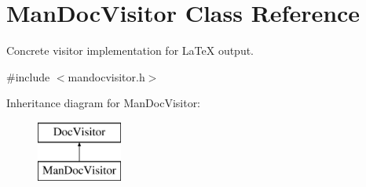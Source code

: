 \hypertarget{class_man_doc_visitor}{}\section{Man\+Doc\+Visitor Class Reference}
\label{class_man_doc_visitor}


Concrete visitor implementation for La\+TeX output.  




{\ttfamily \#include $<$mandocvisitor.\+h$>$}

Inheritance diagram for Man\+Doc\+Visitor\+:\begin{figure}[H]
\begin{center}
\leavevmode
\includegraphics[height=2.000000cm]{class_man_doc_visitor}
\end{center}
\end{figure}
